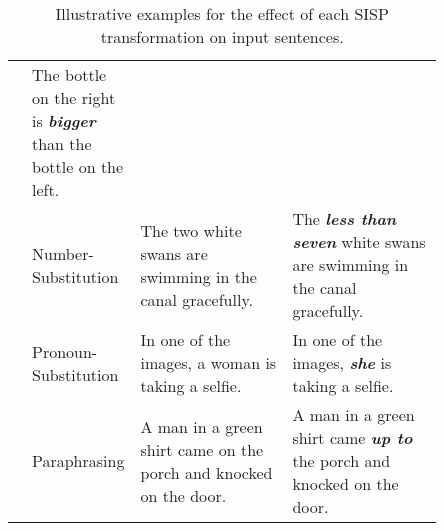 \begin{table}
{\begin{tabular}{@{}clp{0.425\linewidth}p{0.425\linewidth}@{}}
            & The bottle on the right is \textit{\textbf{bigger}} than the bottle on the left.\\
         & Number-Substitution  
            & The two white swans are swimming in the canal gracefully. 
            & The \textit{\textbf{less than seven}} white swans are swimming in the canal gracefully.\\ 
         & Pronoun-Substitution 
            & In one of the images, a woman is taking a selfie. 
            & In one of the images, \textit{\textbf{she}} is taking a selfie.\\
         & Paraphrasing         
            & A man in a green shirt came on the porch and knocked on the door.
            & A man in a green shirt came \textit{\textbf{up to}} the porch and knocked on the door. \\
        \bottomrule 
    \end{tabular}
    }
    \caption{Illustrative examples for the effect of each SISP transformation on input sentences.}
    \label{tab:sisp_examples}
\end{table}